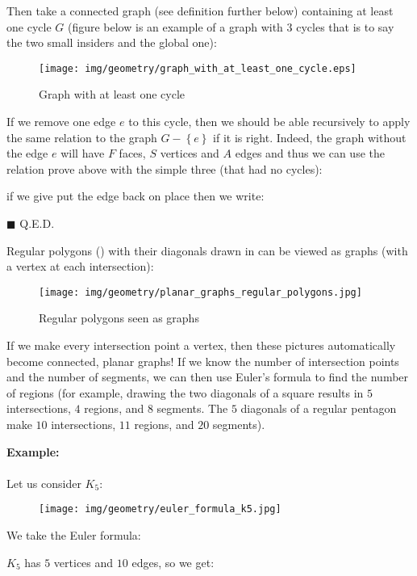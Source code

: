 {\begin{enumerate}
\begin{dem}
Then take a connected graph (see definition further below) containing at least one cycle $G$ (figure below is an example of a graph with $3$ cycles that is to say the two small insiders and the global one):
\begin{figure}[H]
\centering
\texttt{[image: img/geometry/graph\_with\_at\_least\_one\_cycle.eps]}
\caption{Graph with at least one cycle}
\end{figure}

If we remove one edge $e$ to this cycle, then we should be able recursively to apply the same relation to the graph $G-\left\lbrace e \right\rbrace$ if it is right. Indeed, the graph without the edge $e$ will have $F$ faces, $S$ vertices and $A$ edges and thus we can use the relation prove above with the simple three (that had no cycles):
	
if we give put the edge back on place then we write:
	
	
	\begin{flushright}
		$\blacksquare$  Q.E.D.
	\end{flushright}
\end{dem}
	Regular polygons () with their diagonals drawn in can be viewed as graphs (with a vertex at each intersection):
	\begin{figure}[H]
		\centering
			\texttt{[image: img/geometry/planar\_graphs\_regular\_polygons.jpg]}
		\caption{Regular polygons seen as graphs}
	\end{figure}
	 If we make every intersection point a vertex, then these pictures automatically become connected, planar graphs! If we know the number of intersection points and the number of segments, we can then use Euler's formula to find the number of regions (for example, drawing the two diagonals of a square results in $5$ intersections, $4$ regions, and $8$ segments. The $5$ diagonals of a regular pentagon make $10$ intersections, $11$ regions, and $20$ segments). 
	 
	 \begin{tcolorbox}[colframe=black,colback=white,sharp corners]
	\textbf{{\Large {}}Example:}\\\\
	Let us consider $K_5$:
	\begin{figure}[H]
		\centering
		\texttt{[image: img/geometry/euler\_formula\_k5.jpg]}
	\end{figure}
	We take the Euler formula:
	
	$K_5$ has $5$ vertices and $10$ edges, so we get:
	

\end{tcolorbox}
\end{enumerate}}

